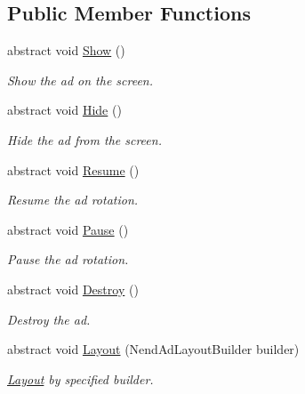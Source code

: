 \subsection*{Public Member Functions}
\begin{DoxyCompactItemize}
\item 
abstract void \hyperlink{class_nend_unity_plugin_1_1_a_d_1_1_nend_ad_a64a5cf2a6e4134ee1635b6a050f94348}{Show} ()
\begin{DoxyCompactList}\small\item\em Show the ad on the screen. \end{DoxyCompactList}\item 
abstract void \hyperlink{class_nend_unity_plugin_1_1_a_d_1_1_nend_ad_a8cf9b30f5566964400c369bd044037ab}{Hide} ()
\begin{DoxyCompactList}\small\item\em Hide the ad from the screen. \end{DoxyCompactList}\item 
abstract void \hyperlink{class_nend_unity_plugin_1_1_a_d_1_1_nend_ad_a0dcd2ae0092f4193f397b5fc6847a8a3}{Resume} ()
\begin{DoxyCompactList}\small\item\em Resume the ad rotation. \end{DoxyCompactList}\item 
abstract void \hyperlink{class_nend_unity_plugin_1_1_a_d_1_1_nend_ad_a7c6f80794d7fb7a4d314f86d359d319d}{Pause} ()
\begin{DoxyCompactList}\small\item\em Pause the ad rotation. \end{DoxyCompactList}\item 
abstract void \hyperlink{class_nend_unity_plugin_1_1_a_d_1_1_nend_ad_a9e60be02c7586ba99f0fed84965a18c4}{Destroy} ()
\begin{DoxyCompactList}\small\item\em Destroy the ad. \end{DoxyCompactList}\item 
abstract void \hyperlink{class_nend_unity_plugin_1_1_a_d_1_1_nend_ad_ac3307c647a1bb68338bc11cc580dbd53}{Layout} (Nend\+Ad\+Layout\+Builder builder)
\begin{DoxyCompactList}\small\item\em \hyperlink{namespace_nend_unity_plugin_1_1_layout}{Layout} by specified builder. \end{DoxyCompactList}\end{DoxyCompactItemize}


